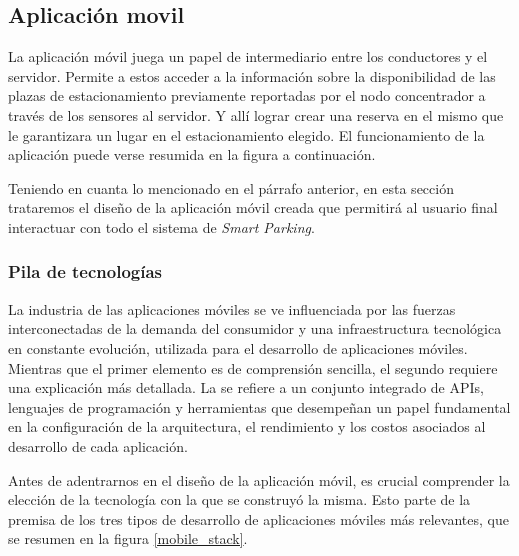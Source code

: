 \clearpage

\subsection{Aplicación movil} \label{title:mobile_aplication}

La aplicación móvil juega un papel de intermediario entre los conductores y el servidor. Permite a estos acceder a la información sobre la disponibilidad de las plazas de estacionamiento previamente reportadas por el nodo concentrador a través de los sensores al servidor. Y allí lograr crear una reserva en el mismo que le garantizara un lugar en el estacionamiento elegido. El funcionamiento de la aplicación puede verse resumida en la figura a continuación.


Teniendo en cuanta lo mencionado en el párrafo anterior, en esta sección trataremos el diseño de la aplicación móvil creada que permitirá al usuario final interactuar con todo el sistema de \textit{Smart Parking}.

\subsubsection{Pila de tecnologías}
La industria de las aplicaciones móviles se ve influenciada por las fuerzas interconectadas de la demanda del consumidor y una infraestructura tecnológica en constante evolución, utilizada para el desarrollo de aplicaciones móviles. Mientras que el primer elemento es de comprensión sencilla, el segundo requiere una explicación más detallada. La  se refiere a un conjunto integrado de APIs, lenguajes de programación y herramientas que desempeñan un papel fundamental en la configuración de la arquitectura, el rendimiento y los costos asociados al desarrollo de cada aplicación.

Antes de adentrarnos en el diseño de la aplicación móvil, es crucial comprender la elección de la tecnología con la que se construyó la misma. Esto parte de la premisa de los tres tipos de desarrollo de aplicaciones móviles más relevantes, que se resumen en la figura \ref{mobile_stack}.


